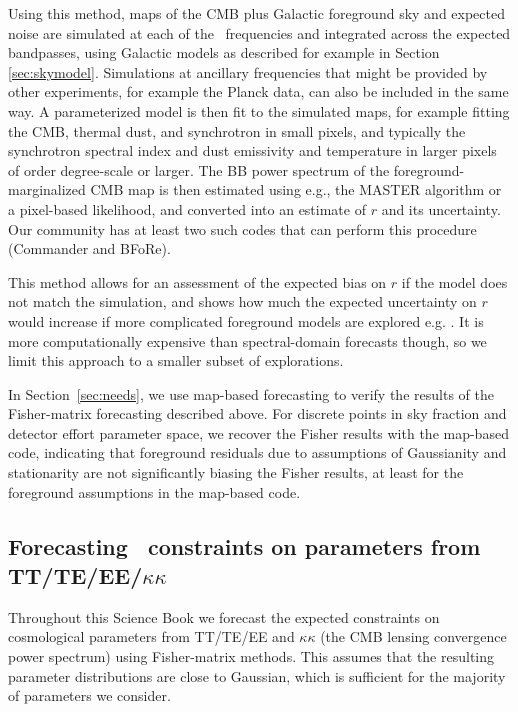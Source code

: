 Using this method, maps of the CMB plus Galactic foreground sky and expected noise are simulated at each of the \cmbexp\ frequencies and integrated across the expected bandpasses, using Galactic models as described for example in Section \ref{sec:skymodel}. Simulations at ancillary frequencies that might be provided by other experiments, for example the Planck data, can also be included in the same way. A parameterized model is then fit to the simulated maps, for example fitting the CMB, thermal dust, and synchrotron in small pixels, and typically the synchrotron spectral index and dust emissivity and temperature in larger pixels of order degree-scale or larger. The BB power spectrum of the foreground-marginalized CMB map is then estimated using e.g., the MASTER \cite{Hivon:2001jp} algorithm or a pixel-based likelihood, and converted into an estimate of $r$ and its uncertainty. Our community has at least two such codes that can perform this procedure (Commander and BFoRe).

This method allows for an assessment of the expected bias on $r$ if the model does not match the simulation, and shows how much the expected uncertainty on $r$ would increase if more complicated foreground models are explored e.g. \cite{ArmitageCaplan:2011sn,Remazeilles:2015hpa}. It is more computationally expensive than spectral-domain forecasts though, so we limit this approach to a smaller subset of explorations. 

In Section~\ref{sec:needs}, we use map-based forecasting to verify the results of the Fisher-matrix 
forecasting described above. For discrete points in sky fraction and detector effort parameter space, 
we recover the Fisher results with the map-based code, indicating that foreground residuals due to 
assumptions of Gaussianity and stationarity are not significantly biasing the Fisher results, at least for
the foreground assumptions in the map-based code.

\subsection{Forecasting \cmbexp\ constraints on parameters from TT/TE/EE/$\kappa\kappa$}
\label{sec:ttee}

Throughout this Science Book we forecast the expected constraints on cosmological parameters from TT/TE/EE and $\kappa\kappa$ (the CMB lensing convergence power spectrum) using Fisher-matrix methods. This assumes that the resulting parameter distributions are close to Gaussian, which is sufficient for the majority of parameters we consider.

